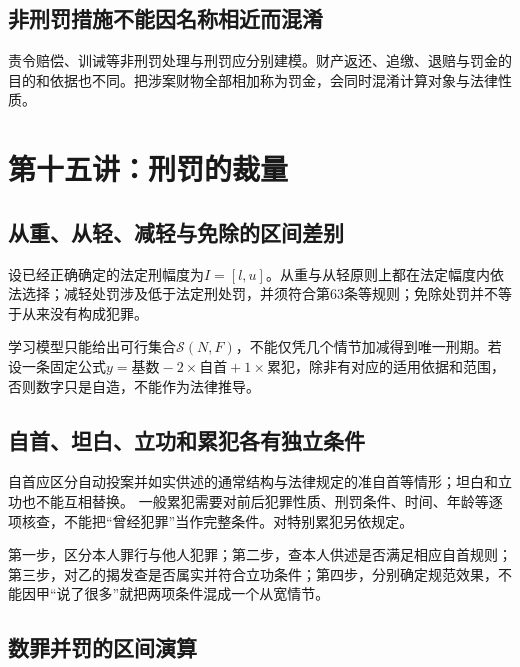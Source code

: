 \subsection{非刑罚措施不能因名称相近而混淆}
责令赔偿、训诫等非刑罚处理与刑罚应分别建模。财产返还、追缴、退赔与罚金的目的和依据也不同。把涉案财物全部相加称为罚金，会同时混淆计算对象与法律性质。


\section{第十五讲：刑罚的裁量}
\subsection{从重、从轻、减轻与免除的区间差别}
设已经正确确定的法定刑幅度为$I=[l,u]$。从重与从轻原则上都在法定幅度内依法选择；减轻处罚涉及低于法定刑处罚，并须符合第63条等规则；免除处罚并不等于从来没有构成犯罪。

学习模型只能给出可行集合$\mathcal S(N,F)$，不能仅凭几个情节加减得到唯一刑期。若设一条固定公式$y=\text{基数}-2\times\text{自首}+1\times\text{累犯}$，除非有对应的适用依据和范围，否则数字只是自造，不能作为法律推导。

\subsection{自首、坦白、立功和累犯各有独立条件}
自首应区分自动投案并如实供述的通常结构与法律规定的准自首等情形；坦白和立功也不能互相替换。 一般累犯需要对前后犯罪性质、刑罚条件、时间、年龄等逐项核查，不能把“曾经犯罪”当作完整条件。对特别累犯另依规定。

第一步，区分本人罪行与他人犯罪；第二步，查本人供述是否满足相应自首规则；第三步，对乙的揭发查是否属实并符合立功条件；第四步，分别确定规范效果，不能因甲“说了很多”就把两项条件混成一个从宽情节。

\subsection{数罪并罚的区间演算}

